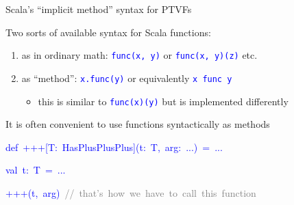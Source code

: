 \documentclass[english]{beamer}
\newenvironment{lyxcode}
   {\par\begin{list}{}{
     \setlength{\rightmargin}{\leftmargin}
     \setlength{\listparindent}{0pt}%
     \raggedright
     \setlength{\itemsep}{0pt}
     \setlength{\parsep}{0pt}
     \normalfont\ttfamily}%
    \def\{{\char`\{}
    \def\}{\char`\}}
    \def\textasciitilde{\char`\~}
    \item[]}
   {\end{list}}
\begin{document}
\begin{frame}{Scala's ``implicit method'' syntax for PTVFs}

Two sorts of available syntax for Scala functions:
\begin{enumerate}
\item as in ordinary math: \texttt{\textcolor{blue}{\footnotesize{}func(x,
y)}} or \texttt{\textcolor{blue}{\footnotesize{}func(x, y)(z)}} etc.
\item as ``method'': \texttt{\textcolor{blue}{\footnotesize{}x.func(y)}}
or equivalently \texttt{\textcolor{blue}{\footnotesize{}x func y}}
\ 
\begin{itemize}
\item this is similar to \texttt{\textcolor{blue}{\footnotesize{}func(x)(y)}}
but is implemented differently
\end{itemize}
\end{enumerate}
It is often convenient to use functions syntactically as methods
\begin{lyxcode}
\textcolor{blue}{\footnotesize{}def~+++{[}T:~HasPlusPlusPlus{]}(t:~T,~arg:~...)~=~...}{\footnotesize \par}

\textcolor{blue}{\footnotesize{}val~t:~T~=~...}{\footnotesize \par}

\textcolor{blue}{\footnotesize{}+++(t,~arg)~}\textrm{\textcolor{gray}{\footnotesize{}//~that's~how~we~have~to~call~this~function}}{\footnotesize \par}


\end{lyxcode}
\end{frame}
\end{document}

